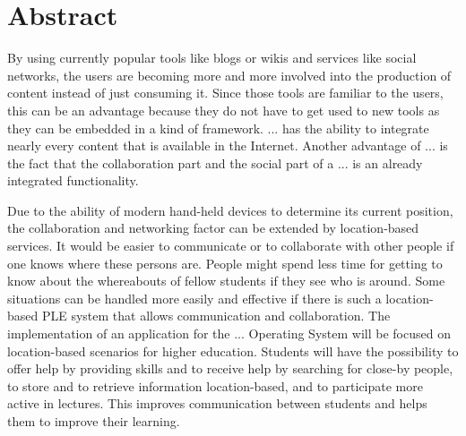 \chapter*{Abstract}

By using currently popular tools like blogs or wikis and services like social networks, the users are becoming more and more involved into the production of content instead of just consuming it. Since those tools are familiar to the users, this can be an advantage because they do not have to get used to new tools as they can be embedded in a kind of framework. ... has the ability to integrate nearly every content that is available in the Internet. Another advantage of ... is the fact that the collaboration part and the social part of a ... is an already integrated functionality. 

Due to the ability of modern hand-held devices to determine its current position, the collaboration and networking factor can be extended by location-based services. It would be easier to communicate or to collaborate with other people if one knows where these persons are. People might spend less time for getting to know about the whereabouts of fellow students if they see who is around. Some situations can be handled more easily and effective if there is such a location-based PLE system that allows communication and collaboration. The implementation of an application for the ... Operating System will be focused on location-based scenarios for higher education. Students will have the possibility to offer help by providing skills and to receive help by searching for close-by people, to store and to retrieve information location-based, and to participate more active in lectures. This improves communication between students and helps them to improve their learning.
